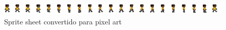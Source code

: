 \begin{figure}[htbp]
    \centering
    \caption{\small Sprite sheet convertido para pixel art}
    \label{fig:godmodAispriteSheetPixel}
    \includegraphics[width=1\linewidth]{figs/godmodAI/Pixilart/pixilart-sprite.png}
\end{figure}



